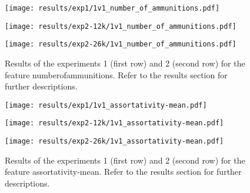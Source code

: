  
\begin{figure}[h!]
    \centering
	\begin{minipage}{0.3\linewidth}
		\texttt{[image: results/exp1/1v1\_number\_of\_ammunitions.pdf]}
	\end{minipage}

	\begin{minipage}{0.3\linewidth}
		\texttt{[image: results/exp2-12k/1v1\_number\_of\_ammunitions.pdf]}
	\end{minipage}
	\begin{minipage}{0.3\linewidth}
		\texttt{[image: results/exp2-26k/1v1\_number\_of\_ammunitions.pdf]}
	\end{minipage}

	\caption[ Results: Feature number\textunderscore of\textunderscore ammunitions]{ Results of the experiments 1 (first row) and 2 (second row) for the feature number\textunderscore of\textunderscore ammunitions. Refer to the results section for further descriptions. }
	\label{fig:appendix_number_of_ammunitions}
\end{figure}
 
\begin{figure}[h!]
    \centering
	\begin{minipage}{0.3\linewidth}
		\texttt{[image: results/exp1/1v1\_assortativity-mean.pdf]}
	\end{minipage}

	\begin{minipage}{0.3\linewidth}
		\texttt{[image: results/exp2-12k/1v1\_assortativity-mean.pdf]}
	\end{minipage}
	\begin{minipage}{0.3\linewidth}
		\texttt{[image: results/exp2-26k/1v1\_assortativity-mean.pdf]}
	\end{minipage}

	\caption[ Results: Feature assortativity-mean]{ Results of the experiments 1 (first row) and 2 (second row) for the feature assortativity-mean. Refer to the results section for further descriptions. }
	\label{fig:appendix_assortativity-mean}
\end{figure}
 \newpage 

